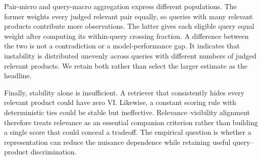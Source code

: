 Pair-micro and query-macro aggregation express different populations. The former weights every judged relevant pair equally, so queries with many relevant products contribute more observations. The latter gives each eligible query equal weight after computing its within-query crossing fraction. A difference between the two is not a contradiction or a model-performance gap. It indicates that instability is distributed unevenly across queries with different numbers of judged relevant products. We retain both rather than select the larger estimate as the headline.

Finally, stability alone is insufficient. A retriever that consistently hides every relevant product could have zero VI. Likewise, a constant scoring rule with deterministic ties could be stable but ineffective. Relevance--visibility alignment therefore treats relevance as an essential companion criterion rather than building a single score that could conceal a tradeoff. The empirical question is whether a representation can reduce the nuisance dependence while retaining useful query--product discrimination.
